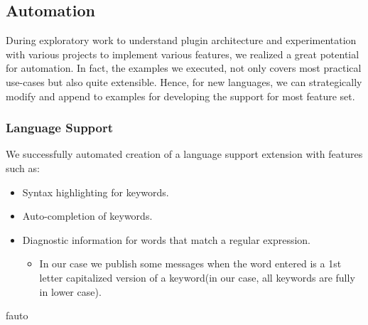 \documentclass[dvipsnames]{article}
\newcommand{\loadFig}[1]{{%
  \expandafter\let\csname if#1\endcsname\iftrue%
  }
}%
\begin{document}
\subsection{Automation}
During exploratory work to understand plugin architecture and experimentation with various projects to implement various features, we realized a great potential for automation.
In fact, the examples we executed, not only covers most practical use-cases but also quite extensible.
Hence, for new languages, we can strategically modify and append to examples\cite{vsceex} for developing the support for most feature set.

\subsubsection{Language Support}
We successfully automated creation of a language support extension with features such as:
\begin{itemize}
  \item Syntax highlighting for keywords.
  \item Auto-completion of keywords.
  \item Diagnostic information for words that match a regular expression. 
  \begin{itemize}
    \item In our case we publish some messages when the word entered is a 1st letter capitalized version of a keyword(in our case, all keywords are fully in lower case).
  \end{itemize} 
\end{itemize}

\loadFig{auto}
\end{document}
